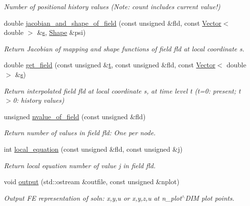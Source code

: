\begin{DoxyCompactItemize}
\begin{DoxyCompactList}\small\item\em Number of positional history values (Note\+: count includes current value!) \end{DoxyCompactList}\item 
double \hyperlink{classoomph_1_1ProjectablePMLFourierDecomposedHelmholtzElement_aa2dd1c8b7262a2719d3c181ccac74c7e}{jacobian\+\_\+and\+\_\+shape\+\_\+of\+\_\+field} (const unsigned \&fld, const \hyperlink{classoomph_1_1Vector}{Vector}$<$ double $>$ \&\hyperlink{cfortran_8h_ab7123126e4885ef647dd9c6e3807a21c}{s}, \hyperlink{classoomph_1_1Shape}{Shape} \&psi)
\begin{DoxyCompactList}\small\item\em Return Jacobian of mapping and shape functions of field fld at local coordinate s. \end{DoxyCompactList}\item 
double \hyperlink{classoomph_1_1ProjectablePMLFourierDecomposedHelmholtzElement_a53156274a681c286bbb20920e925b55e}{get\+\_\+field} (const unsigned \&\hyperlink{cfortran_8h_af6f0bd3dc13317f895c91323c25c2b8f}{t}, const unsigned \&fld, const \hyperlink{classoomph_1_1Vector}{Vector}$<$ double $>$ \&\hyperlink{cfortran_8h_ab7123126e4885ef647dd9c6e3807a21c}{s})
\begin{DoxyCompactList}\small\item\em Return interpolated field fld at local coordinate s, at time level t (t=0\+: present; t$>$0\+: history values) \end{DoxyCompactList}\item 
unsigned \hyperlink{classoomph_1_1ProjectablePMLFourierDecomposedHelmholtzElement_af96096d961b9611419ba010223e55d4e}{nvalue\+\_\+of\+\_\+field} (const unsigned \&fld)
\begin{DoxyCompactList}\small\item\em Return number of values in field fld\+: One per node. \end{DoxyCompactList}\item 
int \hyperlink{classoomph_1_1ProjectablePMLFourierDecomposedHelmholtzElement_a1802d1737bb3af15f79a8581880c1b55}{local\+\_\+equation} (const unsigned \&fld, const unsigned \&j)
\begin{DoxyCompactList}\small\item\em Return local equation number of value j in field fld. \end{DoxyCompactList}\item 
void \hyperlink{classoomph_1_1ProjectablePMLFourierDecomposedHelmholtzElement_abd1a586c0951d26cb145288ed5884ecb}{output} (std\+::ostream \&outfile, const unsigned \&nplot)
\begin{DoxyCompactList}\small\item\em Output FE representation of soln\+: x,y,u or x,y,z,u at n\+\_\+plot$^\wedge$\+D\+IM plot points. \end{DoxyCompactList}\end{DoxyCompactItemize}
